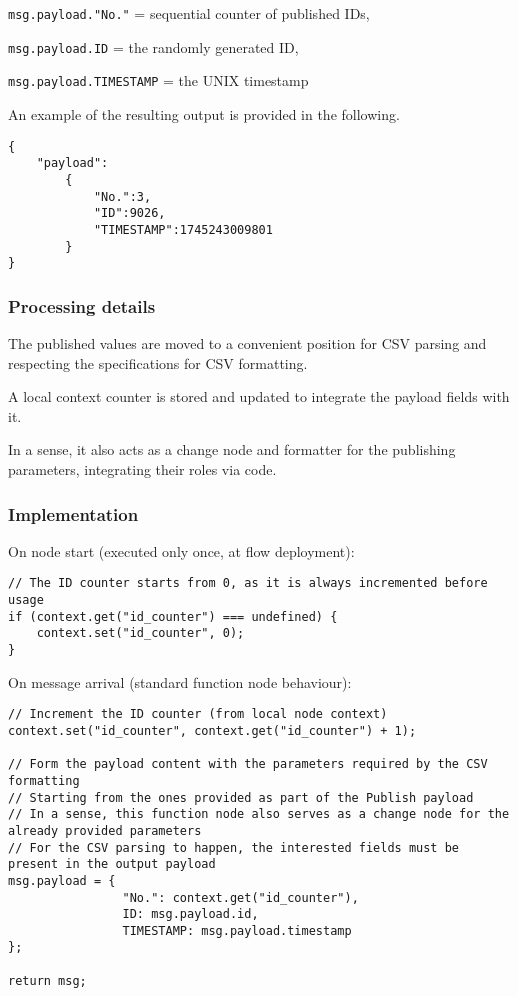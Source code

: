 \documentclass[a4paper,11pt]{article} %
\begin{document}
    \texttt{msg.payload."No."} = sequential counter of published IDs,

    \texttt{msg.payload.ID} = the randomly generated ID,

    \texttt{msg.payload.TIMESTAMP} = the UNIX timestamp

    \medskip

    An example of the resulting output is provided in the following.

    \begin{verbatim}
{
    "payload":
        {
            "No.":3,
            "ID":9026,
            "TIMESTAMP":1745243009801
        }
}
    \end{verbatim}

    \subsubsection{Processing details}

    The published values are moved to a convenient position for CSV parsing and respecting the specifications for CSV formatting.

    \smallskip

    A local context counter is stored and updated to integrate the payload fields with it.

    \smallskip

    In a sense, it also acts as a change node and formatter for the publishing parameters, integrating their roles via code.

    \subsubsection{Implementation}

    On node start (executed only once, at flow deployment):

    \begin{verbatim}
// The ID counter starts from 0, as it is always incremented before usage
if (context.get("id_counter") === undefined) {
    context.set("id_counter", 0);
}
    \end{verbatim}

    On message arrival (standard function node behaviour):

    \begin{verbatim}
// Increment the ID counter (from local node context)
context.set("id_counter", context.get("id_counter") + 1);

// Form the payload content with the parameters required by the CSV formatting
// Starting from the ones provided as part of the Publish payload
// In a sense, this function node also serves as a change node for the already provided parameters
// For the CSV parsing to happen, the interested fields must be present in the output payload
msg.payload = {
                "No.": context.get("id_counter"),
                ID: msg.payload.id,
                TIMESTAMP: msg.payload.timestamp
};

return msg;
    \end{verbatim}
\end{document}
